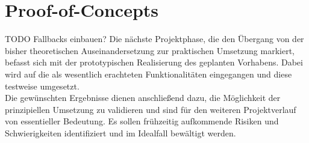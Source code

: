 
\section{Proof-of-Concepts}

TODO Fallbacks einbauen?
Die nächste Projektphase, die den Übergang von der bisher theoretischen Auseinandersetzung zur praktischen Umsetzung markiert, befasst sich mit der prototypischen Realisierung des geplanten Vorhabens. Dabei wird auf die als wesentlich erachteten  Funktionalitäten eingegangen und diese testweise umgesetzt.\\
Die gewünschten Ergebnisse dienen anschließend dazu, die Möglichkeit der prinzipiellen Umsetzung zu validieren und sind für den weiteren Projektverlauf von essentieller Bedeutung. Es sollen frühzeitig aufkommende Risiken und Schwierigkeiten identifiziert  und im Idealfall bewältigt werden.

\vspace{0.5cm}

